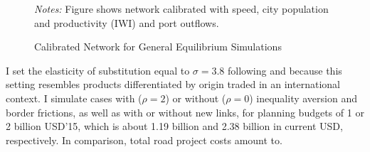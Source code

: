 \documentclass[a4paper]{article}
\begin{document}
\begin{figure}[h!] \vspace{-2mm}
\centering
\caption{\label{fig:Graph_Calib} Calibrated Network for General Equilibrium Simulations}
\vspace{2mm}
\scriptsize 
\emph{Notes:} Figure shows network calibrated with speed, city population and productivity (IWI) and port outflows. 
\end{figure}

I set the elasticity of substitution equal to $\sigma = 3.8$ following \citet{bajzik2020estimating} and \citet{armington1969theory} because this setting resembles products differentiated by origin traded in an international context. I simulate cases with ($\rho = 2$) or without ($\rho = 0$) inequality aversion and border frictions, as well as with or without new links, for planning budgets of 1 or 2 billion USD'15, which is about 1.19 billion and 2.38 billion in current USD, respectively. In comparison, total road project costs amount to. 




\newpage


\end{document}
